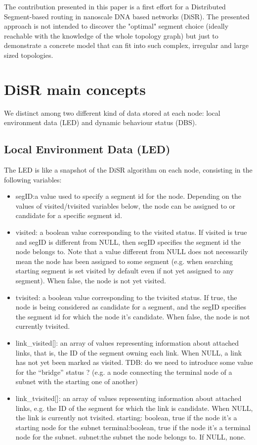 \documentclass[final,journal,letterpaper]{IEEEtran}
\begin{document}
The contribution presented in this paper is a first effort for a
Distributed Segment-based routing in nanoscale DNA based networks
(DiSR). The presented approach is not intended to discover the "optimal"
segment choice (ideally reachable with the knowledge of the whole
topology graph) but just to demonstrate a concrete model that can fit
into such complex, irregular and large sized topologies.

\section{DiSR main concepts}

We distinct among two different kind of data stored at each node:
local environment data (LED) and dynamic behaviour status (DBS).

\subsection{Local Environment Data (LED)}

The LED is like a snapshot of the DiSR algorithm on each node,
consisting in the following variables:

\begin{itemize}
\item{segID}:a value used to specify a segment id for the node. Depending on
the values of visited/tvisited variables below, the node can be
assigned to or candidate for a specific segment id.  
\item{visited}: a boolean value corresponding to the visited status. If visited is true
and segID is different from NULL, then segID specifies the segment id
the node belongs to. Note that a value different from NULL does not
necessarily mean the node has been assigned to some segment (e.g. when
searching starting segment is set visited by default even if not yet
assigned to any segment). When false, the node is not yet visited.
\item{tvisited}: a boolean value corresponding to the tvisited status. If
true, the node is being considered as candidate for a segment, and the
segID specifies the segment id for which the node it's candidate. When
false, the node is not currently tvisited.  
\item{link\_visited[]}: an array
of values representing information about attached links, that is, the
ID of the segment owning each link. When NULL, a link has not yet been
marked as visited. TDB: do we need to introduce some value for the
“bridge” status ? (e.g. a node connecting the terminal node of a
subnet with the starting one of another) 
\item{link\_tvisited[]}: an array of
values representing information about attached links, e.g. the ID of
the segment for which the link is candidate. When NULL, the link is
currently not tvisited.  starting: boolean, true if the node it's a
starting node for the subnet terminal:boolean, true if the node it's a
terminal node for the subnet.  subnet:the subnet the node belongs to.
If NULL, none.
\end{itemize}
\end{document}
